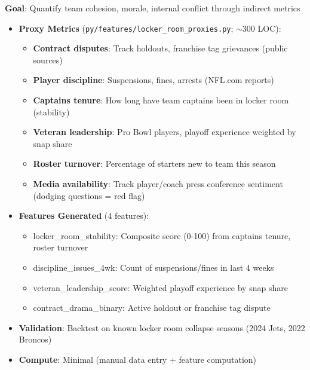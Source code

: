 \textbf{Goal}: Quantify team cohesion, morale, internal conflict through indirect metrics

\begin{itemize}
  \item {} \textbf{Proxy Metrics} (\texttt{py/features/locker\_room\_proxies.py}; $\sim$300 LOC):
  \begin{itemize}
    \item \textbf{Contract disputes}: Track holdouts, franchise tag grievances (public sources)
    \item \textbf{Player discipline}: Suspensions, fines, arrests (NFL.com reports)
    \item \textbf{Captains tenure}: How long have team captains been in locker room (stability)
    \item \textbf{Veteran leadership}: Pro Bowl players, playoff experience weighted by snap share
    \item \textbf{Roster turnover}: Percentage of starters new to team this season
    \item \textbf{Media availability}: Track player/coach press conference sentiment (dodging questions = red flag)
  \end{itemize}
  \item {} \textbf{Features Generated} (4 features):
  \begin{itemize}
    \item locker\_room\_stability: Composite score (0-100) from captains tenure, roster turnover
    \item discipline\_issues\_4wk: Count of suspensions/fines in last 4 weeks
    \item veteran\_leadership\_score: Weighted playoff experience by snap share
    \item contract\_drama\_binary: Active holdout or franchise tag dispute
  \end{itemize}
  \item {} \textbf{Validation}: Backtest on known locker room collapse seasons (2024 Jets, 2022 Broncos)
  \item \textbf{Compute}: Minimal (manual data entry + feature computation)
\end{itemize}

